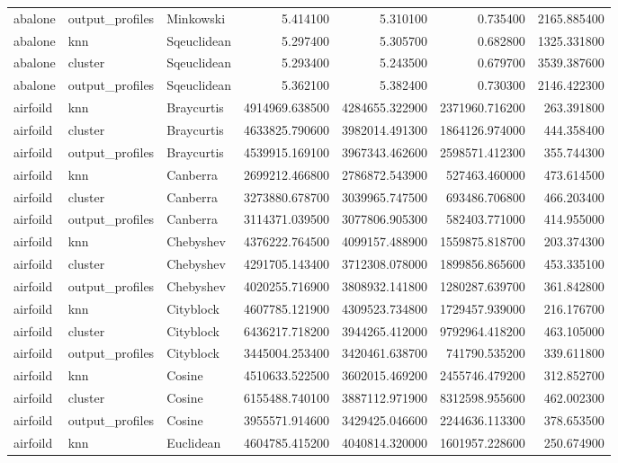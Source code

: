 \begin{tabular}{lllrrrr}
abalone & output\_profiles & Minkowski & 5.414100 & 5.310100 & 0.735400 & 2165.885400 \\
abalone & knn & Sqeuclidean & 5.297400 & 5.305700 & 0.682800 & 1325.331800 \\
abalone & cluster & Sqeuclidean & 5.293400 & 5.243500 & 0.679700 & 3539.387600 \\
abalone & output\_profiles & Sqeuclidean & 5.362100 & 5.382400 & 0.730300 & 2146.422300 \\
airfoild & knn & Braycurtis & 4914969.638500 & 4284655.322900 & 2371960.716200 & 263.391800 \\
airfoild & cluster & Braycurtis & 4633825.790600 & 3982014.491300 & 1864126.974000 & 444.358400 \\
airfoild & output\_profiles & Braycurtis & 4539915.169100 & 3967343.462600 & 2598571.412300 & 355.744300 \\
airfoild & knn & Canberra & 2699212.466800 & 2786872.543900 & 527463.460000 & 473.614500 \\
airfoild & cluster & Canberra & 3273880.678700 & 3039965.747500 & 693486.706800 & 466.203400 \\
airfoild & output\_profiles & Canberra & 3114371.039500 & 3077806.905300 & 582403.771000 & 414.955000 \\
airfoild & knn & Chebyshev & 4376222.764500 & 4099157.488900 & 1559875.818700 & 203.374300 \\
airfoild & cluster & Chebyshev & 4291705.143400 & 3712308.078000 & 1899856.865600 & 453.335100 \\
airfoild & output\_profiles & Chebyshev & 4020255.716900 & 3808932.141800 & 1280287.639700 & 361.842800 \\
airfoild & knn & Cityblock & 4607785.121900 & 4309523.734800 & 1729457.939000 & 216.176700 \\
airfoild & cluster & Cityblock & 6436217.718200 & 3944265.412000 & 9792964.418200 & 463.105000 \\
airfoild & output\_profiles & Cityblock & 3445004.253400 & 3420461.638700 & 741790.535200 & 339.611800 \\
airfoild & knn & Cosine & 4510633.522500 & 3602015.469200 & 2455746.479200 & 312.852700 \\
airfoild & cluster & Cosine & 6155488.740100 & 3887112.971900 & 8312598.955600 & 462.002300 \\
airfoild & output\_profiles & Cosine & 3955571.914600 & 3429425.046600 & 2244636.113300 & 378.653500 \\
airfoild & knn & Euclidean & 4604785.415200 & 4040814.320000 & 1601957.228600 & 250.674900 \\

\end{tabular}
